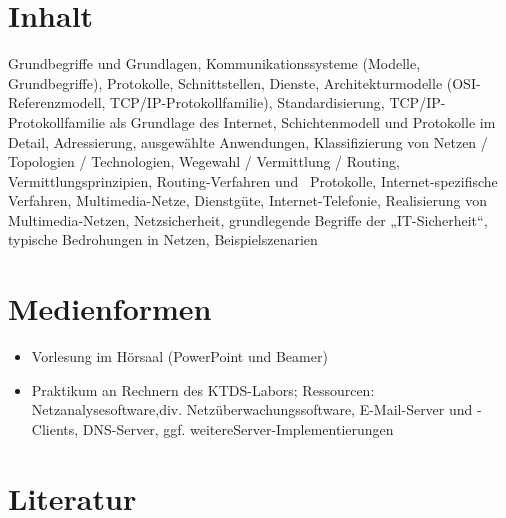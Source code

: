 \hypertarget{inhaltpathlabelmi-2017modulbeschreibungen-bachelorba_kommunikationstechnikundnetze}{%
\section*{Inhalt\label{/mi-2017/modulbeschreibungen-bachelor/BA_KommunikationstechnikundNetze}}\label{inhaltpathlabelmi-2017modulbeschreibungen-bachelorba_kommunikationstechnikundnetze}}

Grundbegriffe und Grundlagen, Kommunikationssysteme (Modelle,
Grundbegriffe), Protokolle, Schnittstellen, Dienste, Architekturmodelle
(OSI-Referenzmodell, TCP/IP-Protokollfamilie), Standardisierung,
TCP/IP-Protokollfamilie als Grundlage des Internet, Schichtenmodell und
Protokolle im Detail, Adressierung, ausgewählte Anwendungen,
Klassifizierung von Netzen / Topologien / Technologien, Wegewahl /
Vermittlung / Routing, Vermittlungsprinzipien, Routing-Verfahren und~
Protokolle, Internet-spezifische Verfahren, Multimedia-Netze,
Dienstgüte, Internet-Telefonie, Realisierung von Multimedia-Netzen,
Netzsicherheit, grundlegende Begriffe der „IT-Sicherheit``, typische
Bedrohungen in Netzen, Beispielszenarien

\hypertarget{medienformenpathlabelmi-2017modulbeschreibungen-bachelorba_kommunikationstechnikundnetze}{%
\section*{Medienformen\label{/mi-2017/modulbeschreibungen-bachelor/BA_KommunikationstechnikundNetze}}\label{medienformenpathlabelmi-2017modulbeschreibungen-bachelorba_kommunikationstechnikundnetze}}

\begin{itemize}
\tightlist
\item
  Vorlesung im Hörsaal (PowerPoint und Beamer)
\item
  Praktikum an Rechnern des KTDS-Labors; Ressourcen:
  Netzanalysesoftware,div. Netzüberwachungssoftware, E-Mail-Server und
  -Clients, DNS-Server, ggf. weitereServer-Implementierungen
\end{itemize}

\hypertarget{literaturpathlabelmi-2017modulbeschreibungen-bachelorba_kommunikationstechnikundnetze}{%
\section*{Literatur\label{/mi-2017/modulbeschreibungen-bachelor/BA_KommunikationstechnikundNetze}}\label{literaturpathlabelmi-2017modulbeschreibungen-bachelorba_kommunikationstechnikundnetze}}

